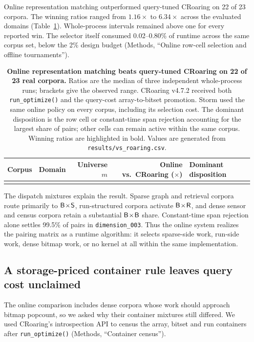 Online representation matching outperformed query-tuned CRoaring on 22 of 23 corpora. The winning
ratios ranged from $1.16\times$ to $6.34\times$ across the evaluated domains
(Table~\ref{tab:corpora}). Whole-process intervals remained above one for every reported win. The
selector itself consumed 0.02--0.80\% of runtime across the same corpus set, below
the 2\% design budget (Methods, ``Online row-cell selection and offline tournaments'').

\begin{table}[!p]
\scriptsize
\setlength{\tabcolsep}{3.8pt}
\renewcommand\arraystretch{1.02}
\centering
\caption{\textbf{Online representation matching beats query-tuned CRoaring on 22 of 23 real
corpora.} Ratios are the median of three independent whole-process runs; brackets give the observed
range. CRoaring v4.7.2 received both \texttt{run\_optimize()} and the query-cost array-to-bitset
promotion. Storm used the same online policy on every corpus, including its selection cost. The
dominant disposition is the row cell or constant-time span rejection accounting for the largest
share of pairs; other cells can remain active within the same corpus. Winning ratios are highlighted
in bold. Values are generated from \texttt{results/vs\_roaring.csv}.}
\label{tab:corpora}
\begin{tabular}{@{}l l r r l@{}}
\toprule
Corpus & Domain & Universe $m$ & Online vs.\ CRoaring ($\times$) & Dominant disposition \\
\midrule
\tabularnewline
\bottomrule
\end{tabular}
\end{table}

The dispatch mixtures explain the result. Sparse graph and retrieval corpora route primarily to
$\textsf{B}\!\times\!\textsf{S}$, run-structured corpora activate $\textsf{B}\!\times\!\textsf{R}$, and dense sensor and census
corpora retain a substantial $\textsf{B}\!\times\!\textsf{B}$ share. Constant-time span rejection alone settles
99.5\% of pairs in \texttt{dimension\_003}. Thus the online system realizes the pairing matrix as a
runtime algorithm: it selects sparse-side work, run-side work, dense bitmap work, or no kernel at all
within the same implementation.

\subsection*{A storage-priced container rule leaves query cost unclaimed}
\label{sec:r3}

The online comparison includes dense corpora whose work should approach bitmap popcount, so we asked
why their container mixtures still differed. We used CRoaring's introspection API to census the
array, bitset and run containers after \texttt{run\_optimize()} (Methods, ``Container census'').

